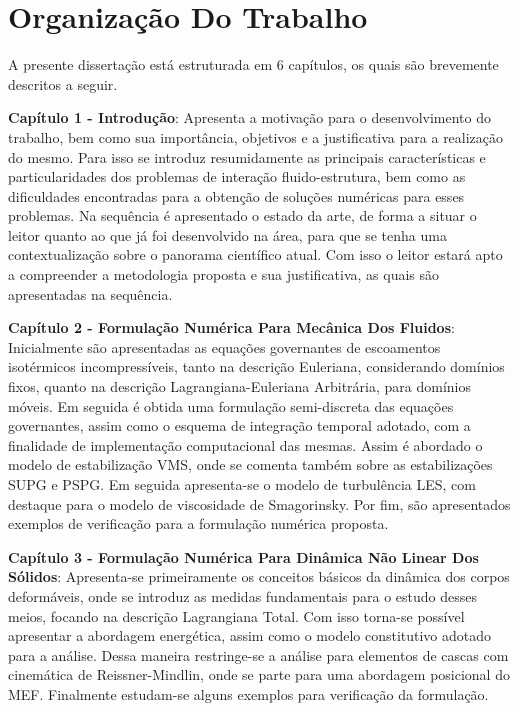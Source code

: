 \section{Organização Do Trabalho}

A presente dissertação está estruturada em 6 capítulos, os quais são brevemente descritos a seguir.

    {
        \newcommand{\Capi}[2]{\textbf{Capítulo #1 - #2}:}

        \Capi{1}{Introdução} Apresenta a motivação para o desenvolvimento do trabalho, bem como sua importância, objetivos e a justificativa para a realização do mesmo. Para isso se introduz resumidamente as principais características e particularidades dos problemas de interação fluido-estrutura, bem como as dificuldades encontradas para a obtenção de soluções numéricas para esses problemas. Na sequência é apresentado o estado da arte, de forma a situar o leitor quanto ao que já foi desenvolvido na área, para que se tenha uma contextualização sobre o panorama científico atual. Com isso o leitor estará apto a compreender a metodologia proposta e sua justificativa, as quais são apresentadas na sequência.

        \Capi{2}{Formulação Numérica Para Mecânica Dos Fluidos} Inicialmente são apresentadas as equações governantes de escoamentos isotérmicos incompressíveis, tanto na descrição Euleriana, considerando domínios fixos, quanto na descrição Lagrangiana-Euleriana Arbitrária, para domínios móveis. Em seguida é obtida uma formulação semi-discreta das equações governantes, assim como o esquema de integração temporal adotado, com a finalidade de implementação computacional das mesmas. Assim é abordado o modelo de estabilização VMS, onde se comenta também sobre as estabilizações SUPG e PSPG. Em seguida apresenta-se o modelo de turbulência LES, com destaque para o modelo de viscosidade de Smagorinsky. Por fim, são apresentados exemplos de verificação para a formulação numérica proposta.

        \Capi{3}{Formulação Numérica Para Dinâmica Não Linear Dos Sólidos} Apresenta-se primeiramente os conceitos básicos da dinâmica dos corpos deformáveis, onde se introduz as medidas fundamentais para o estudo desses meios, focando na descrição Lagrangiana Total. Com isso torna-se possível apresentar a abordagem energética, assim como o modelo constitutivo adotado para a análise. Dessa maneira restringe-se a análise para elementos de cascas com cinemática de Reissner-Mindlin, onde se parte para uma abordagem posicional do MEF. Finalmente estudam-se alguns exemplos para verificação da formulação.

}
